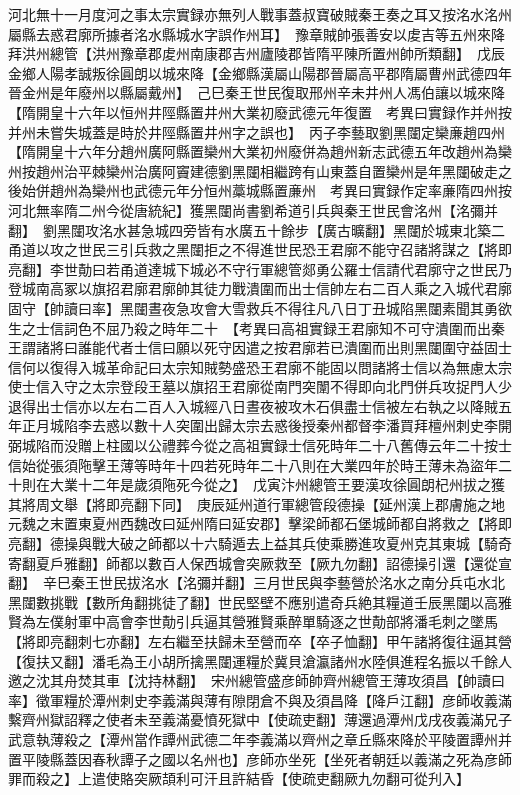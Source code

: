 河北無十一月度河之事太宗實録亦無列人戰事蓋叔寶破賊秦王奏之耳又按洺水洺州屬縣去惑君廓所據者洺水縣城水字誤作州耳】　豫章賊帥張善安以䖍吉等五州來降拜洪州總管【洪州豫章郡䖍州南康郡吉州廬陵郡皆隋平陳所置州帥所類翻】　戊辰金鄉人陽孝誠叛徐圓朗以城來降【金鄉縣漢屬山陽郡晉屬高平郡隋屬曹州武德四年晉金州是年廢州以縣屬戴州】　己巳秦王世民復取邢州辛未井州人馮伯讓以城來降【隋開皇十六年以恒州井陘縣置井州大業初廢武德元年復置　考異曰實録作并州按并州未嘗失城蓋是時於井陘縣置井州字之誤也】　丙子李藝取劉黑闥定欒亷趙四州【隋開皇十六年分趙州廣阿縣置欒州大業初州廢併為趙州新志武德五年改趙州為欒州按趙州治平棘欒州治廣阿竇建德劉黑闥相繼跨有山東蓋自置欒州是年黑闥破走之後始併趙州為欒州也武德元年分恒州藁城縣置亷州　考異曰實録作定率亷隋四州按河北無率隋二州今從唐統紀】獲黑闥尚書劉希道引兵與秦王世民會洺州【洺彌并翻】　劉黑闥攻洺水甚急城四旁皆有水廣五十餘步【廣古曠翻】黑闥於城東北築二甬道以攻之世民三引兵救之黑闥拒之不得進世民恐王君廓不能守召諸將謀之【將即亮翻】李世勣曰若甬道達城下城必不守行軍總管郯勇公羅士信請代君廓守之世民乃登城南高冢以旗招君廓君廓帥其徒力戰潰圍而出士信帥左右二百人乘之入城代君廓固守【帥讀曰率】黑闥晝夜急攻會大雪救兵不得往凡八日丁丑城陷黑闥素聞其勇欲生之士信詞色不屈乃殺之時年二十　【考異曰高祖實録王君廓知不可守潰圍而出秦王謂諸將曰誰能代者士信曰願以死守因遣之按君廓若已潰圍而出則黑闥圍守益固士信何以復得入城革命記曰太宗知賊勢盛恐王君廓不能固以問諸將士信以為無慮太宗使士信入守之太宗登段王墓以旗招王君廓從南門突闈不得即向北門併兵攻捉門人少退得出士信亦以左右二百人入城經八日晝夜被攻木石俱盡士信被左右執之以降賊五年正月城陷李去惑以數十人突圍出歸太宗去惑後授秦州都督李潘買拜檀州刺史李開弼城陷而没贈上柱國以公禮葬今從之高祖實録士信死時年二十八舊傳云年二十按士信始從張須陁擊王薄等時年十四若死時年二十八則在大業四年於時王薄未為盜年二十則在大業十二年是歲須陁死今從之】　戊寅汴州總管王要漢攻徐圓朗杞州拔之獲其將周文舉【將即亮翻下同】　庚辰延州道行軍總管段德操【延州漢上郡膚施之地元魏之末置東夏州西魏改曰延州隋曰延安郡】擊梁師都石堡城師都自將救之【將即亮翻】德操與戰大破之師都以十六騎遁去上益其兵使乘勝進攻夏州克其東城【騎奇寄翻夏戶雅翻】師都以數百人保西城會突厥救至【厥九勿翻】詔德操引還【還從宣翻】　辛巳秦王世民拔洺水【洺彌并翻】三月世民與李藝營於洺水之南分兵屯水北黑闥數挑戰【數所角翻挑徒了翻】世民堅壁不應别遣奇兵絶其糧道壬辰黑闥以高雅賢為左僕射軍中高會李世勣引兵逼其營雅賢乘醉單騎逐之世勣部將潘毛刺之墜馬【將即亮翻刺七亦翻】左右繼至扶歸未至營而卒【卒子恤翻】甲午諸將復往逼其營【復扶又翻】潘毛為王小胡所擒黑闥運糧於冀貝滄瀛諸州水陸俱進程名振以千餘人邀之沈其舟焚其車【沈持林翻】　宋州總管盛彦師帥齊州總管王薄攻須昌【帥讀曰率】徵軍糧於潭州刺史李義滿與薄有隙閉倉不與及須昌降【降戶江翻】彦師收義滿繫齊州獄詔釋之使者未至義滿憂憤死獄中【使疏吏翻】薄還過潭州戊戌夜義滿兄子武意執薄殺之【潭州當作譚州武德二年李義滿以齊州之章丘縣來降於平陵置譚州并置平陵縣蓋因春秋譚子之國以名州也】彦師亦坐死【坐死者朝廷以義滿之死為彦師罪而殺之】上遣使賂突厥頡利可汗且許結昏【使疏吏翻厥九勿翻可從刋入】

